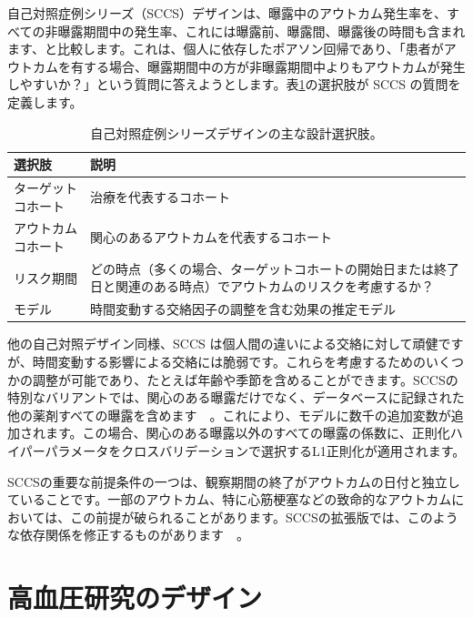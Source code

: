 \documentclass[
  11pt]{book}
\theoremstyle{definition}
\theoremstyle{definition}
\theoremstyle{definition}
\theoremstyle{definition}
\theoremstyle{remark}
\begin{document}
自己対照症例シリーズ（SCCS）デザイン\citep[ ]{farrington_1995, whitaker_2006}は、曝露中のアウトカム発生率を、すべての非曝露期間中の発生率、これには曝露前、曝露間、曝露後の時間も含まれます、と比較します。これは、個人に依存したポアソン回帰であり、「患者がアウトカムを有する場合、曝露期間中の方が非曝露期間中よりもアウトカムが発生しやすいか？」という質問に答えようとします。表\ref{tab:sccsChoices}の選択肢が SCCS の質問を定義します。  

\begin{table}
\centering
\caption{\label{tab:sccsChoices}自己対照症例シリーズデザインの主な設計選択肢。}
\centering
\begin{tabular}[t]{l>{\raggedright\arraybackslash}p{9cm}}
\toprule
選択肢 & 説明\\
\midrule
ターゲットコホート & 治療を代表するコホート\\
アウトカムコホート & 関心のあるアウトカムを代表するコホート\\
リスク期間 & どの時点（多くの場合、ターゲットコホートの開始日または終了日と関連のある時点）でアウトカムのリスクを考慮するか？\\
モデル & 時間変動する交絡因子の調整を含む効果の推定モデル\\
\bottomrule
\end{tabular}
\end{table}

他の自己対照デザイン同様、SCCS は個人間の違いによる交絡に対して頑健ですが、時間変動する影響による交絡には脆弱です。これらを考慮するためのいくつかの調整が可能であり、たとえば年齢や季節を含めることができます。SCCSの特別なバリアントでは、関心のある曝露だけでなく、データベースに記録された他の薬剤すべての曝露を含めます　\citep[ ]{simpson_2013}。これにより、モデルに数千の追加変数が追加されます。この場合、関心のある曝露以外のすべての曝露の係数に、正則化ハイパーパラメータをクロスバリデーションで選択するL1正則化が適用されます。

SCCSの重要な前提条件の一つは、観察期間の終了がアウトカムの日付と独立していることです。一部のアウトカム、特に心筋梗塞などの致命的なアウトカムにおいては、この前提が破られることがあります。SCCSの拡張版では、このような依存関係を修正するものがあります　\citep[ ]{farrington_2011}。

\section{高血圧研究のデザイン}\label{ux9ad8ux8840ux5727ux7814ux7a76ux306eux30c7ux30b6ux30a4ux30f3}
\end{document}
